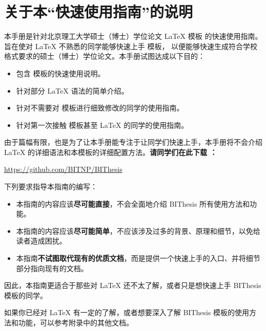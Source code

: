\chapter*{关于本“快速使用指南”的说明}

本手册是针对北京理工大学硕士（博士）学位论文 \LaTeX{} 模板 \BIThesis{} 的快速使用指南。
旨在使对 \LaTeX{} 不熟悉的同学能够快速上手 \BIThesis{} 模板，
以便能够快速生成符合学校格式要求的硕士（博士）学位论文。本手册试图达成以下目的：
\begin{itemize}[noitemsep]
  \item 包含 \BIThesis{} 模板的快速使用说明。
  \item 针对部分 \LaTeX{} 语法的简单介绍。
  \item 针对不需要对 \BIThesis{} 模板进行细致修改的同学的使用指南。
  \item 针对第一次接触 \BIThesis{} 模板甚至 \LaTeX{} 的同学的使用指南。
\end{itemize}

由于篇幅有限，也是为了让本手册能专注于让同学们快速上手，本手册将不会介绍
\LaTeX{} 的详细语法和本模板的详细配置方法。\textbf{请同学们在此下载 \BIThesis{}：}
\begin{center}
  \url{https://github.com/BITNP/BIThesis}
\end{center}

下列要求指导本指南的编写：

\begin{itemize}
  \item 本指南的内容应该\textbf{尽可能直接}，不会全面地介绍 BIThesis 所有使用方法和功能。
  \item 本指南的内容应该\textbf{尽可能简单}，不应该涉及过多的背景、原理和细节，以免给读者造成困扰。
  \item 本指南\textbf{不试图取代现有的优质文档}，而是提供一个快速上手的入口、并将细节部分指向现有的文档。
\end{itemize}

因此，本指南更适合于那些对 \LaTeX{} 还不太了解，或者只是想快速上手 BIThesis 模板的同学。

如果你已经对 \LaTeX{} 有一定的了解，或者想要深入了解 BIThesis 模板的使用方法和功能，可以参考附录中的其他文档。

